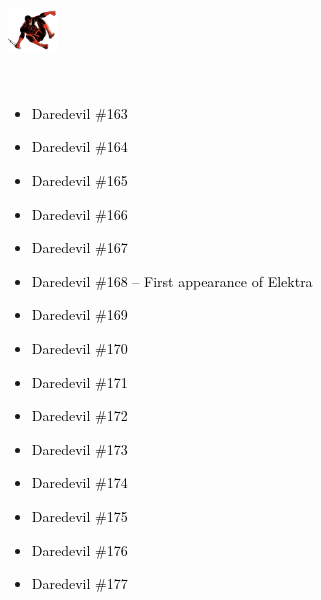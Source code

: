 \documentclass[12pt]{article}
\newcommand{\checkbox}{\raisebox{0.0ex}{\fbox{\rule{0ex}{1.5ex} \rule{1.5ex}{0ex}}}}
\begin{document}
\begin{center}
    \vspace*{2cm}
    \includegraphics[width=0.1\textwidth]{daredevil1.png}
    \vspace{0.3cm}

    {\Huge \textbf{\textcolor{white}{Daredevil Chronological Checklist}}}
\end{center}

\vspace{0.3cm}
\noindent
\begin{tcolorbox}[
  colback=white!95!gray,
  colframe=black,
  width=\textwidth,
  arc=4mm,
  auto outer arc,
  boxrule=0.8pt,
  left=8pt,right=8pt,top=8pt,bottom=8pt
]
\begin{itemize}[left=0pt,label={\checkbox}]
    \item \textcolor{black}{Daredevil \#163}
    \item \textcolor{black}{Daredevil \#164}
    \item \textcolor{black}{Daredevil \#165}
    \item \textcolor{black}{Daredevil \#166}
    \item \textcolor{black}{Daredevil \#167}
    \item \textcolor{black}{Daredevil \#168 – First appearance of Elektra}
    \item \textcolor{black}{Daredevil \#169}
    \item \textcolor{black}{Daredevil \#170}
    \item \textcolor{black}{Daredevil \#171}
    \item \textcolor{black}{Daredevil \#172}
    \item \textcolor{black}{Daredevil \#173}
    \item \textcolor{black}{Daredevil \#174}
    \item \textcolor{black}{Daredevil \#175}
    \item \textcolor{black}{Daredevil \#176}
    \item \textcolor{black}{Daredevil \#177}
\end{itemize}
\end{tcolorbox}
\end{document}
